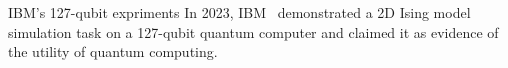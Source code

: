 \documentclass[10pt]{beamer}
\begin{document}
\begin{CJK}{UTF8}{gbsn}
 \begin{frame}[fragile]{IBM's 127-qubit expriments}
  In 2023, IBM~ demonstrated a 2D Ising model simulation task on a 127-qubit quantum computer and claimed it as evidence of the utility of quantum computing.
   \begin{figure}
     \centering
     \begin{subfigure}[t]{0.3\textwidth}
     \end{subfigure}
     \hfill
     \begin{subfigure}[t]{0.65\textwidth}
     \end{subfigure}
   \end{figure}
 \end{frame}
\end{CJK}
\end{document}
